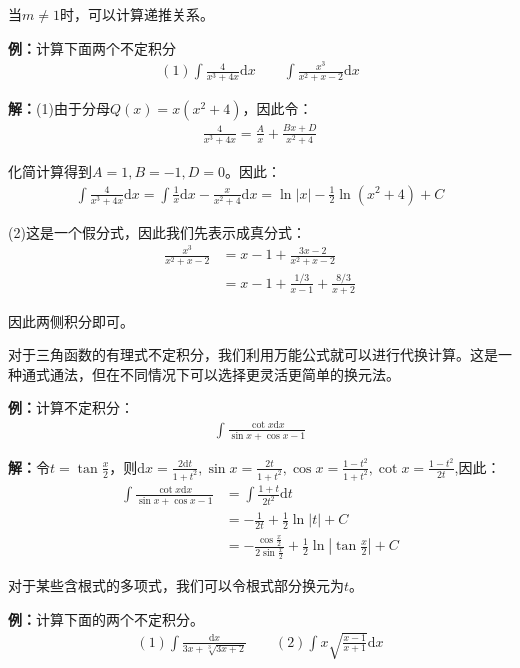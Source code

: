\documentclass{ctexart}
\let\oldtextbf\textbf %
\renewcommand{\textbf}[1]{\textcolor{btex}{\oldtextbf{#1}}} %
\begin{document}
当$m\neq 1$时，可以计算递推关系。

\textbf{例：}计算下面两个不定积分
\begin{align*}
  (1)  \int \frac{4}{x^3+4x}\mathrm{d}x\qquad \int \frac{x^3}{x^2+x-2}\mathrm{d}x
\end{align*}

\textbf{解：}(1)由于分母$Q(x)=x(x^2+4)$，因此令：
\begin{align*}
    \frac{4}{x^3+4x}=\frac{A}{x}+\frac{Bx+D}{x^2+4}
\end{align*}

化简计算得到$A=1,B=-1,D=0$。因此：
\begin{align*}
    \int \frac{4}{x^3+4x}\mathrm{d}x=\int\frac{1}{x}\mathrm{d}x-\frac{x}{x^2+4}\mathrm{d}x=\ln|x|-\frac{1}{2}\ln(x^2+4)+C
\end{align*}

(2)这是一个假分式，因此我们先表示成真分式：
\begin{align*}
    \frac{x^3}{x^2+x-2}&=x-1+\frac{3x-2}{x^2+x-2}\\
    &=x-1+\frac{1/3}{x-1}+\frac{8/3}{x+2}
\end{align*}

因此两侧积分即可。

对于三角函数的有理式不定积分，我们利用万能公式就可以进行代换计算。这是一种通式通法，但在不同情况下可以选择更灵活更简单的换元法。

\textbf{例：}计算不定积分：
\begin{align*}
    \int\frac{\cot x\mathrm{d}x}{\sin x+\cos x-1}
\end{align*}

\textbf{解：}令$t=\tan\frac{x}{2}$，则$\mathrm{d}x=\frac{2\mathrm{d}t}{1+t^2},\sin x=\frac{2t}{1+t^2},\cos x=\frac{1-t^2}{1+t^2},\cot x=\frac{1-t^2}{2t}$,因此：
\begin{align*}
    \int\frac{\cot x\mathrm{d}x}{\sin x+\cos x-1}&=\int\frac{1+t}{2t^2}\mathrm{d}t\\
    &=-\frac{1}{2t}+\frac{1}{2}\ln|t|+C\\
    &=-\frac{\cos\frac{x}{2}}{2\sin\frac{x}{2}}+\frac{1}{2}\ln|\tan\frac{x}{2}|+C
\end{align*}

对于某些含根式的多项式，我们可以令根式部分换元为$t$。

\textbf{例：}计算下面的两个不定积分。
\begin{align*}
    (1)\int\frac{\mathrm{d}x}{3x+\sqrt[3]{3x+2}}\qquad (2)\int x\sqrt{\frac{x-1}{x+1}}\mathrm{d}x
\end{align*}
\end{document}
